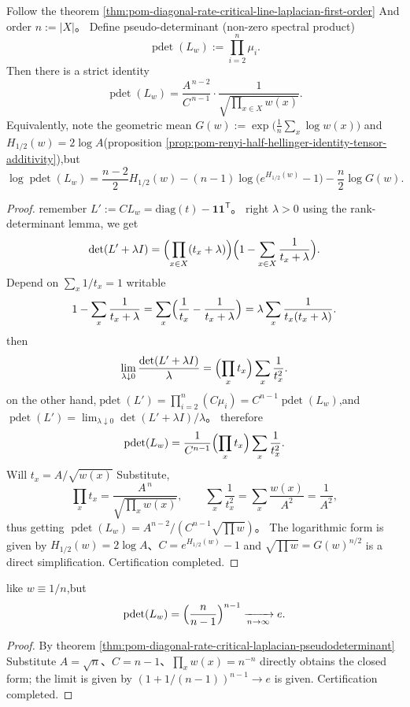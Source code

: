 \begin{theorem}\label{thm:pom-diagonal-rate-critical-laplacian-pseudodeterminant}
Follow the theorem \ref{thm:pom-diagonal-rate-critical-line-laplacian-first-order} And order \(n:=|X|\)。
Define pseudo-determinant (non-zero spectral product)
\[
\operatorname{pdet}(L_w):=\prod_{i=2}^{n}\mu_i.
\]
Then there is a strict identity
\[
\operatorname{pdet}(L_w)=\frac{A^{\,n-2}}{C^{\,n-1}}\cdot \frac{1}{\sqrt{\prod_{x\in X}w(x)}}.
\]
Equivalently, note the geometric mean
\(
G(w):=\exp\bigl(\frac1n\sum_x\log w(x)\bigr)
\)
and \(H_{1/2}(w)=2\log A\)(proposition \ref{prop:pom-renyi-half-hellinger-identity-tensor-additivity}),but
\[
\log\operatorname{pdet}(L_w)
=\frac{n-2}{2}H_{1/2}(w)
-(n-1)\log\bigl(e^{H_{1/2}(w)}-1\bigr)
-\frac{n}{2}\log G(w).
\]
\end{theorem}
\begin{proof}
remember \(L':=CL_w=\mathrm{diag}(t)-\mathbf 1\mathbf 1^{\mathsf T}\)。
right \(\lambda>0\) using the rank-determinant lemma, we get
\[
\det(L'+\lambda I)=\Bigl(\prod_{x\in X}(t_x+\lambda)\Bigr)\Bigl(1-\sum_{x\in X}\frac{1}{t_x+\lambda}\Bigr).
\]
Depend on \(\sum_x 1/t_x=1\) writable
\[
1-\sum_{x}\frac{1}{t_x+\lambda}
=\sum_x\Bigl(\frac{1}{t_x}-\frac{1}{t_x+\lambda}\Bigr)
=\lambda\sum_x\frac{1}{t_x(t_x+\lambda)}.
\]
then
\[
\lim_{\lambda\downarrow 0}\frac{\det(L'+\lambda I)}{\lambda}
=\Bigl(\prod_x t_x\Bigr)\sum_x\frac{1}{t_x^2}.
\]
on the other hand,\(\operatorname{pdet}(L')=\prod_{i=2}^n(C\mu_i)=C^{n-1}\operatorname{pdet}(L_w)\),and
\(
\operatorname{pdet}(L')=\lim_{\lambda\downarrow 0}\det(L'+\lambda I)/\lambda
\)。
therefore
\[
\operatorname{pdet}(L_w)
=\frac{1}{C^{n-1}}\Bigl(\prod_x t_x\Bigr)\sum_x\frac{1}{t_x^2}.
\]
Will \(t_x=A/\sqrt{w(x)}\) Substitute,
\[
\prod_x t_x=\frac{A^{\,n}}{\sqrt{\prod_x w(x)}},
\qquad
\sum_x\frac{1}{t_x^2}=\sum_x\frac{w(x)}{A^2}=\frac{1}{A^2},
\]
thus getting \(\operatorname{pdet}(L_w)=A^{n-2}/(C^{n-1}\sqrt{\prod w})\)。
The logarithmic form is given by \(H_{1/2}(w)=2\log A\)、\(C=e^{H_{1/2}(w)}-1\) and \(\sqrt{\prod w}=G(w)^{n/2}\) is a direct simplification. Certification completed.
\end{proof}



\begin{corollary}\label{cor:pom-diagonal-rate-critical-laplacian-pdet-uniform-limit-e}
like \(w\equiv 1/n\),but
\[
\operatorname{pdet}(L_w)=\Bigl(\frac{n}{n-1}\Bigr)^{n-1}\xrightarrow[n\to\infty]{}e.
\]
\end{corollary}
\begin{proof}
By theorem \ref{thm:pom-diagonal-rate-critical-laplacian-pseudodeterminant} Substitute \(A=\sqrt n\)、\(C=n-1\)、\(\prod_x w(x)=n^{-n}\) directly obtains the closed form; the limit is given by \((1+1/(n-1))^{n-1}\to e\) is given. Certification completed.
\end{proof}

